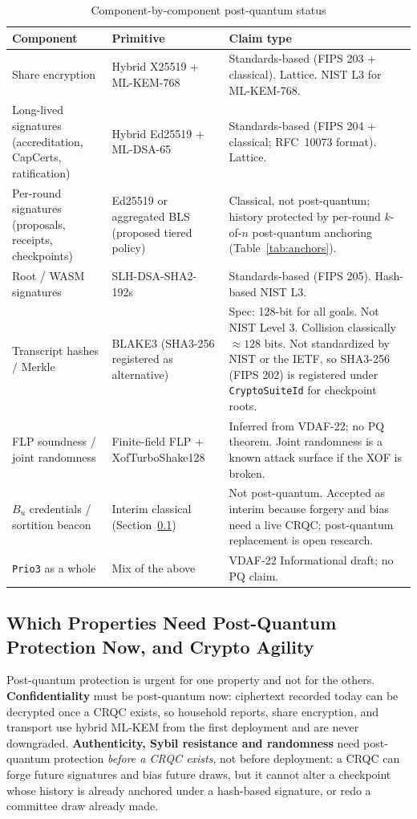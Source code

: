 \documentclass[10pt,twoside,openany]{book}
\theoremstyle{dpepstyle}
\begin{document}
\begin{table}[htbp]
\centering
\caption{Component-by-component post-quantum status}
\label{tab:pq-components}
\scriptsize
\begin{tabularx}{\textwidth}{L{1.35in} L{1.15in} Y}
\toprule
\textbf{Component} & \textbf{Primitive} & \textbf{Claim type} \\
\midrule
Share encryption & Hybrid X25519 + ML-KEM-768 & Standards-based (FIPS 203 + classical). Lattice. NIST L3 for ML-KEM-768. \\
Long-lived signatures (accreditation, CapCerts, ratification) & Hybrid Ed25519 + ML-DSA-65 & Standards-based (FIPS 204 + classical; RFC~10073 format). Lattice. \\
Per-round signatures (proposals, receipts, checkpoints) & Ed25519 or aggregated BLS (proposed tiered policy) & Classical, not post-quantum; history protected by per-round $k$-of-$n$ post-quantum anchoring (Table~\ref{tab:anchors}). \\
Root / WASM signatures & SLH-DSA-SHA2-192s & Standards-based (FIPS 205). Hash-based NIST L3. \\
Transcript hashes / Merkle & BLAKE3 (SHA3-256 registered as alternative) & Spec: 128-bit for all goals. Not NIST Level 3. Collision classically $\approx 128$ bits. Not standardized by NIST or the IETF, so SHA3-256 (FIPS 202) is registered under \texttt{CryptoSuiteId} for checkpoint roots. \\
FLP soundness / joint randomness & Finite-field FLP + XofTurboShake128 & Inferred from VDAF-22; no PQ theorem. Joint randomness is a known attack surface if the XOF is broken. \\
$B_u$ credentials / sortition beacon & Interim classical (Section~\ref{sec:pq-urgency}) & Not post-quantum. Accepted as interim because forgery and bias need a live CRQC; post-quantum replacement is open research. \\
\texttt{Prio3} as a whole & Mix of the above & VDAF-22 Informational draft; no PQ claim. \\
\bottomrule
\end{tabularx}
\end{table}

\subsection{Which Properties Need Post-Quantum Protection Now, and Crypto Agility}
\label{sec:pq-urgency}

Post-quantum protection is urgent for one property and not for the others. \textbf{Confidentiality} must be post-quantum now: ciphertext recorded today can be decrypted once a CRQC exists, so household reports, share encryption, and transport use hybrid ML-KEM from the first deployment and are never downgraded. \textbf{Authenticity, Sybil resistance and randomness} need post-quantum protection \emph{before a CRQC exists}, not before deployment: a CRQC can forge future signatures and bias future draws, but it cannot alter a checkpoint whose history is already anchored under a hash-based signature, or redo a committee draw already made.
\end{document}

